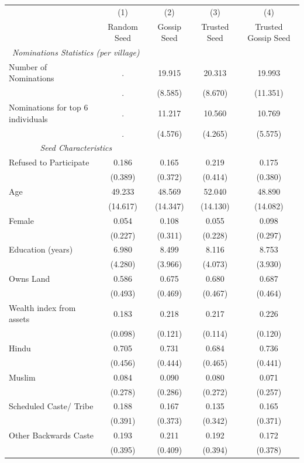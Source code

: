  \begin{tabular}{lcccc} \hline
	& (1) & (2) &  (3) & (4)  \\
& Random Seed & Gossip Seed & Trusted Seed  & Trusted Gossip Seed \\ \hline 
\multicolumn{2}{c}{\emph{Nominations Statistics (per village)}}  & & & \\
 Number of Nominations & . & 19.915 & 20.313  & 19.993 \\ 
  & . & (8.585) & (8.670)  & (11.351) \\ 
 Nominations for top 6 individuals & . & 11.217 & 10.560  & 10.769 \\ 
  & . & (4.576) & (4.265)  & (5.575) \\ 
\multicolumn{2}{c}{\emph{Seed Characteristics}}  & & & \\
 Refused to Participate & 0.186 & 0.165 & 0.219  & 0.175 \\ 
  & (0.389) & (0.372) & (0.414)  & (0.380) \\ 
 Age & 49.233 & 48.569 & 52.040  & 48.890 \\ 
  & (14.617) & (14.347) & (14.130)  & (14.082) \\ 
 Female & 0.054 & 0.108 & 0.055  & 0.098 \\ 
  & (0.227) & (0.311) & (0.228)  & (0.297) \\ 
 Education (years) & 6.980 & 8.499 & 8.116  & 8.753 \\ 
  & (4.280) & (3.966) & (4.073)  & (3.930) \\ 
 Owns Land & 0.586 & 0.675 & 0.680  & 0.687 \\ 
  & (0.493) & (0.469) & (0.467)  & (0.464) \\ 
 Wealth index from assets & 0.183 & 0.218 & 0.217  & 0.226 \\ 
  & (0.098) & (0.121) & (0.114)  & (0.120) \\ 
 Hindu & 0.705 & 0.731 & 0.684  & 0.736 \\ 
  & (0.456) & (0.444) & (0.465)  & (0.441) \\ 
 Muslim & 0.084 & 0.090 & 0.080  & 0.071 \\ 
  & (0.278) & (0.286) & (0.272)  & (0.257) \\ 
 Scheduled Caste/ Tribe & 0.188 & 0.167 & 0.135  & 0.165 \\ 
  & (0.391) & (0.373) & (0.342)  & (0.371) \\ 
 Other Backwards Caste & 0.193 & 0.211 & 0.192  & 0.172 \\ 
  & (0.395) & (0.409) & (0.394)  & (0.378) \\ 

\end{tabular}
